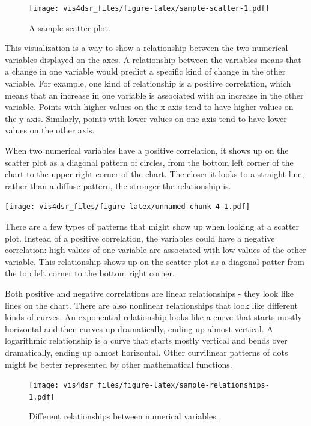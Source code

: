 \documentclass[
]{krantz}
\begin{document}
\begin{figure}
\centering
\texttt{[image: vis4dsr\_files/figure-latex/sample-scatter-1.pdf]}
\caption{\label{fig:sample-scatter}A sample scatter plot.}
\end{figure}

This visualization is a way to show a relationship between the two numerical variables
displayed on the axes. A relationship between the variables means that a change in one
variable would predict a specific kind of change in the other variable. For example,
one kind of relationship is a positive correlation, which means that an increase in
one variable is associated with an increase in the other variable. Points with higher
values on the x axis tend to have higher values on the y axis. Similarly, points
with lower values on one axis tend to have lower values on the other axis.

When two numerical variables have a positive correlation, it shows up on the scatter
plot as a diagonal pattern of circles, from the bottom left corner of the chart to
the upper right corner of the chart. The closer it looks to a straight line, rather
than a diffuse pattern, the stronger the relationship is.

\texttt{[image: vis4dsr\_files/figure-latex/unnamed-chunk-4-1.pdf]}

There are a few types of patterns that might show up when looking at a scatter plot.
Instead of a positive correlation, the variables could have a negative correlation:
high values of one variable are associated with low values of the other variable. This
relationship shows up on the scatter plot as a diagonal patter from the top left
corner to the bottom right corner.

Both positive and negative correlations are linear relationships - they look like
lines on the chart. There are also nonlinear relationships that look like different
kinds of curves. An exponential relationship looks like a curve that starts
mostly horizontal and then curves up dramatically, ending up almost vertical.
A logarithmic relationship is a curve that starts mostly vertical and bends
over dramatically, ending up almost horizontal. Other curvilinear patterns of dots
might be better represented by other mathematical functions.

\begin{figure}
\centering
\texttt{[image: vis4dsr\_files/figure-latex/sample-relationships-1.pdf]}
\caption{\label{fig:sample-relationships}Different relationships between numerical variables.}
\end{figure}
\end{document}
